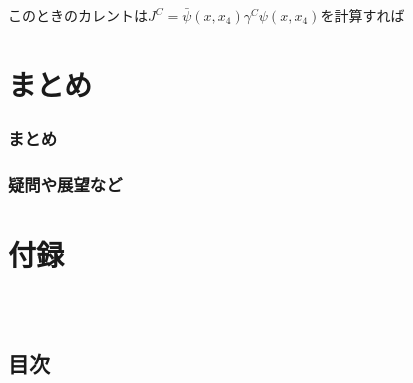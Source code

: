 \documentclass[
  unicode,a4paper,10pt,
  xcolor = {dvipsnames,svgnames},
  hyperref ={colorlinks=true,citecolor=Navy,linkcolor=NavyBlue,urlcolor=purple},
  ja=standard,lualatex
]{beamer}
\begin{document}
\begin{frame}

  このときのカレントは$J^{C}=\bar{\psi}(x,x_{4})\gamma^{C}\psi(x,x_{4})$を計算すれば

  

\end{frame}


\begin{frame}

  

\end{frame}



\section{まとめ}

\begin{frame}[plain]
  \huge \secname
\end{frame}

\begin{frame}
  \frametitle{まとめ}



\end{frame}


\begin{frame}
  \frametitle{疑問や展望など}



\end{frame}



\setcounter{Appendix}{\value{framenumber}}
\setcounter{section}{0}
\renewcommand{\thesubsection}{\Alph{subsection}}
\makeatletter
\renewcommand{\theequation}{\thesubsection.\arabic{equation}}

\renewcommand{\thefigure}{\thesubsection.\arabic{figure}}

\renewcommand{\thetable}{\thesubsection.\arabic{table}}
\makeatother

\section{付録}

\begin{frame}[plain]
  \frametitle{\ }
  \huge \secname
\end{frame}

\subsection{目次}
\end{document}
